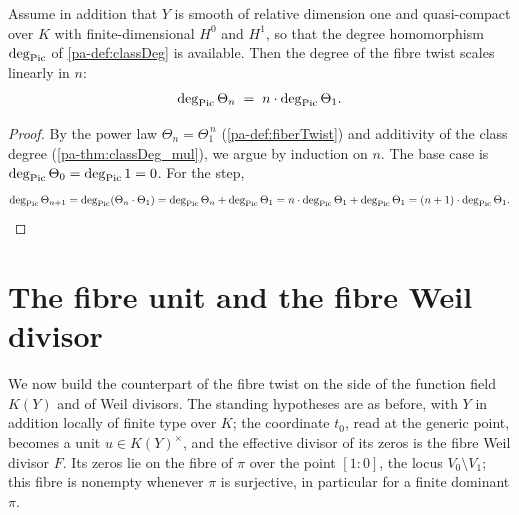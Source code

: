 \begin{theorem}
  \label{pa-thm:classDeg_fiberTwist}
  \leanok

  Assume in addition that \(Y\) is smooth of relative dimension one and quasi-compact over \(K\)
  with finite-dimensional \(H^0\) and \(H^1\), so that the degree homomorphism \(\deg_{\operatorname{Pic}}\) of
  \ref{pa-def:classDeg} is available. Then the degree of the fibre twist scales linearly in \(n\):
  \[
    \deg_{\operatorname{Pic}} \Theta_n \;=\; n \cdot \deg_{\operatorname{Pic}} \Theta_1 .
  \]
\end{theorem}
\begin{proof}
  \leanok
  By the power law \(\Theta_n = \Theta_1^{\,n}\) (\ref{pa-def:fiberTwist}) and additivity of the class
  degree (\ref{pa-thm:classDeg_mul}), we argue by induction on \(n\). The base case is
  \(\deg_{\operatorname{Pic}}\Theta_0 = \deg_{\operatorname{Pic}} 1 = 0\). For the step,
  \[
    \deg_{\operatorname{Pic}}\Theta_{n+1} = \deg_{\operatorname{Pic}}(\Theta_n \cdot \Theta_1)
      = \deg_{\operatorname{Pic}}\Theta_n + \deg_{\operatorname{Pic}}\Theta_1
      = n\cdot\deg_{\operatorname{Pic}}\Theta_1 + \deg_{\operatorname{Pic}}\Theta_1
      = (n+1)\cdot\deg_{\operatorname{Pic}}\Theta_1 . \qedhere
  \]
\end{proof}

\section{The fibre unit and the fibre Weil divisor}

We now build the counterpart of the fibre twist on the side of the function field \(K(Y)\) and of
Weil divisors. The standing hypotheses are as before, with \(Y\) in addition locally of finite
type over \(K\); the coordinate \(t_0\), read at the generic point, becomes a unit \(u \in
K(Y)^{\times}\), and the effective divisor of its zeros is the fibre Weil divisor \(F\). Its zeros
lie on the fibre of \(\pi\) over the point \([1 : 0]\), the locus \(V_0 \setminus V_1\); this fibre
is nonempty whenever \(\pi\) is surjective, in particular for a finite dominant \(\pi\).

